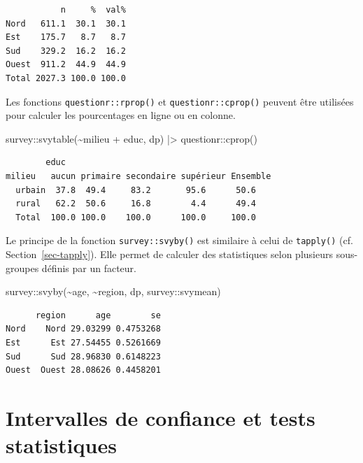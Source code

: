 \documentclass[
  letterpaper,
  DIV=11,
  numbers=noendperiod,
  oneside]{scrreprt}
\newenvironment{Shaded}{\begin{snugshade}}{\end{snugshade}}
\newcommand{\FunctionTok}[1]{\textcolor[rgb]{0.28,0.35,0.67}{#1}}
\newcommand{\NormalTok}[1]{\textcolor[rgb]{0.00,0.23,0.31}{#1}}
\newcommand{\SpecialCharTok}[1]{\textcolor[rgb]{0.37,0.37,0.37}{#1}}
\begin{document}
\begin{verbatim}
           n     %  val%
Nord   611.1  30.1  30.1
Est    175.7   8.7   8.7
Sud    329.2  16.2  16.2
Ouest  911.2  44.9  44.9
Total 2027.3 100.0 100.0
\end{verbatim}

Les fonctions \texttt{questionr::rprop()} et \texttt{questionr::cprop()}
peuvent être utilisées pour calculer les pourcentages en ligne ou en
colonne.

\begin{Shaded}
\begin{Highlighting}[]
\NormalTok{survey}\SpecialCharTok{::}\FunctionTok{svytable}\NormalTok{(}\SpecialCharTok{\textasciitilde{}}\NormalTok{milieu }\SpecialCharTok{+}\NormalTok{ educ, dp) }\SpecialCharTok{|\textgreater{}} 
\NormalTok{  questionr}\SpecialCharTok{::}\FunctionTok{cprop}\NormalTok{()}
\end{Highlighting}
\end{Shaded}

\begin{verbatim}
        educ
milieu   aucun primaire secondaire supérieur Ensemble
  urbain  37.8  49.4     83.2       95.6      50.6   
  rural   62.2  50.6     16.8        4.4      49.4   
  Total  100.0 100.0    100.0      100.0     100.0   
\end{verbatim}

Le principe de la fonction \texttt{survey::svyby()} est similaire à
celui de \texttt{tapply()} (cf. Section~\ref{sec-tapply}). Elle permet
de calculer des statistiques selon plusieurs sous-groupes définis par un
facteur.

\begin{Shaded}
\begin{Highlighting}[]
\NormalTok{survey}\SpecialCharTok{::}\FunctionTok{svyby}\NormalTok{(}\SpecialCharTok{\textasciitilde{}}\NormalTok{age, }\SpecialCharTok{\textasciitilde{}}\NormalTok{region, dp, survey}\SpecialCharTok{::}\NormalTok{svymean)}
\end{Highlighting}
\end{Shaded}

\begin{verbatim}
      region      age        se
Nord    Nord 29.03299 0.4753268
Est      Est 27.54455 0.5261669
Sud      Sud 28.96830 0.6148223
Ouest  Ouest 28.08626 0.4458201
\end{verbatim}

\hypertarget{intervalles-de-confiance-et-tests-statistiques}{%
\section{Intervalles de confiance et tests
statistiques}\label{intervalles-de-confiance-et-tests-statistiques}}
\end{document}
